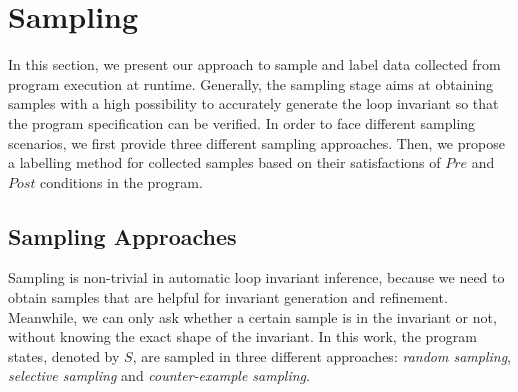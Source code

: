 
\section{Sampling} %
\label{sec:sampling}

In this section, we present our approach to sample and label data 
collected from program execution at runtime. 
Generally, the sampling stage aims at obtaining samples with a high possibility to 
accurately generate the loop invariant so that the program specification can be verified. 
In order to face different sampling scenarios, 
we first provide three different sampling approaches. 
Then, we propose a labelling method for collected samples 
based on their satisfactions of $\mathit{Pre}$ and $\mathit{Post}$ conditions in the program. 

\subsection{Sampling Approaches} %
\label{sub:sampling_approaches}

Sampling is non-trivial in automatic loop invariant inference, 
because we need to obtain samples that are helpful for invariant generation and refinement. 
Meanwhile, we can only ask whether a certain sample is in the invariant or not, 
without knowing the exact shape of the invariant. 
In this work, the program states, denoted by $S$, are sampled in three different approaches: 
\emph{random sampling}, \emph{selective sampling} and \emph{counter-example sampling}. 

